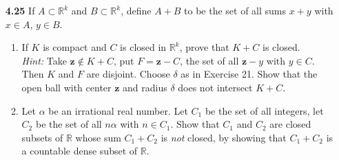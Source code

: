 \documentclass[11pt]{article}
\begin{document}
\begin{itemize}
  \item [\textbf{4.25}]
    If \(A \subset \mathbb{R}^k\) and \(B \subset \mathbb{R}^k\), define \(A + B\) to be the set of all sums \(x + y\) with 
    \(x \in A\), \(y \in B\).
    \begin{enumerate}[label=(\alph*)]
      \item If \(K\) is compact and \(C\) is closed in \(\mathbb{R}^k\), prove that \(K + C\) is closed. \\
        \textit{Hint:} Take \(\textbf{z} \not\in K + C\), put \(F = \textbf{z} - C\), the set of all \(\textbf{z} - y\) 
        with \(y \in C\).  Then \(K\) and \(F\) are disjoint.  Choose \(\delta\) as in Exercise 21.  Show that the open ball 
        with center \(\textbf{z}\) and radius \(\delta\) does not intersect \(K + C\).

      \item Let \(\alpha\) be an irrational real number.  Let \(C_1\) be the set of all integers, let \(C_2\) be the set of all
        \(n\alpha\) with \(n \in C_1\).  Show that \(C_1\) and \(C_2\) are closed subsets of \(\mathbb{R}\) whose sum 
        \(C_1 + C_2\) is \textit{not} closed, by showing that \(C_1 + C_2\) is a countable dense subset of \(\mathbb{R}\).
    \end{enumerate}

  \newpage

\end{itemize}
\end{document}

